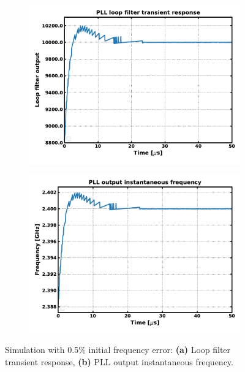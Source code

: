 	\begin{figure}[htb!]
	    \centering
	    \begin{subfigure}{0.5\textwidth}
	        \centering
	        \center\includegraphics[width=1.0\textwidth, angle=0]{figs/trans_loop_filter.pdf}
	        \caption{ }
	        \label{fig:trans_lf}
	    \end{subfigure}%
	    \begin{subfigure}{0.5\textwidth}
	        \centering
	        \center\includegraphics[width=1.0\textwidth, angle=0]{figs/trans_inst_freq.pdf}
	        \caption{ }
	        \label{fig:trans_inst_freq}
	    \end{subfigure}
	    \label{fig:trans_sim1}
	    \caption{Simulation with 0.5\% initial frequency error: \textbf{(a)} Loop filter transient response, \textbf{(b)} PLL output instantaneous frequency.}
	\end{figure}

